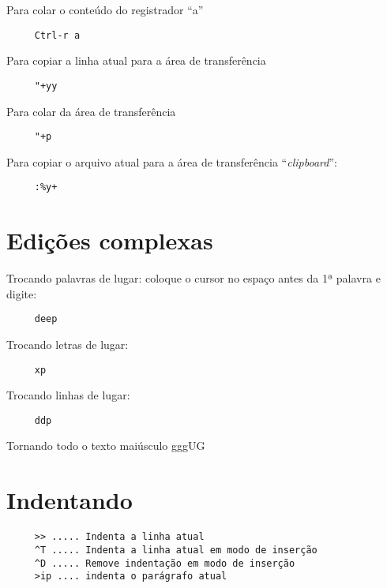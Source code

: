 Para colar o conteúdo do registrador ``a''

\begin{verbatim}
     Ctrl-r a
\end{verbatim}

Para copiar a linha atual para a área de transferência

\begin{verbatim}
     "+yy
\end{verbatim}

Para colar da área de transferência

\begin{verbatim}
     "+p
\end{verbatim}

Para copiar o arquivo atual para a área de transferência ``{\em clipboard}'':

\begin{verbatim}
     :%y+
\end{verbatim}

\section{Edições complexas }
\label{Edições complexas }

Trocando palavras de lugar: coloque o cursor no espaço antes da 1ª palavra e digite:

\begin{verbatim}
     deep
\end{verbatim}

Trocando letras de lugar:

\begin{verbatim}
     xp
\end{verbatim}

Trocando linhas de lugar:

\begin{verbatim}
     ddp
\end{verbatim}

Tornando todo o texto maiúsculo
 gggUG

\section{Indentando }

\begin{verbatim}
     >> ..... Indenta a linha atual
     ^T ..... Indenta a linha atual em modo de inserção
     ^D ..... Remove indentação em modo de inserção
     >ip .... indenta o parágrafo atual
\end{verbatim}

